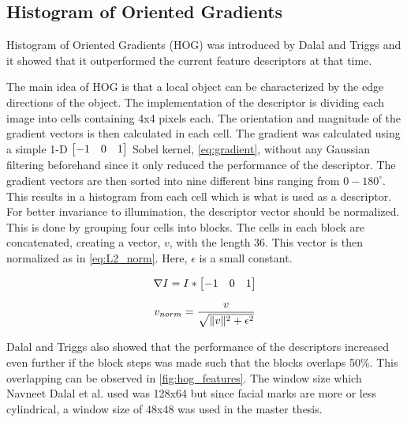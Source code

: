 \subsection{Histogram of Oriented Gradients} \label{subsection:HOG}

Histogram of Oriented Gradients (HOG) was introduced by Dalal and Triggs \cite{hog_dalal} and it showed that it outperformed the current feature descriptors at that time. 

The main idea of HOG is that a local object can be characterized by the edge directions of the object. The implementation of the descriptor is dividing each image into cells containing 4x4 pixels each. The orientation and magnitude of the gradient vectors is then calculated in each cell. The gradient was calculated using a simple 1-D 
$\left[ \begin{array}{@{}*{3}{c}@{}}
	-1 & 0 & 1  \\
\end{array} \right]$ Sobel kernel, \cref{eq:gradient}, without any Gaussian filtering beforehand since it only reduced the performance of the descriptor. The gradient vectors are then sorted into nine different bins ranging from $0-180^{\circ}$. This results in a histogram from each cell which is what is used as a descriptor. For better invariance to illumination, the descriptor vector should be normalized. This is done by grouping four cells into blocks. The cells in each block are concatenated, creating a vector, $v$, with the length 36. This vector is then normalized as in \cref{eq:L2_norm}. Here, $\epsilon$ is a small constant. 

\begin{equation} \label{eq:gradient}
\nabla I = I * \left[ \begin{array}{@{}*{3}{c}@{}}
-1 & 0 & 1  \\
\end{array} \right]
\end{equation}

\begin{equation} \label{eq:L2_norm}
v_{norm} = \frac{v}{\sqrt{\lVert v\rVert^2 + \epsilon^2}}
\end{equation}

Dalal and Triggs also showed that the performance of the descriptors increased even further if the block steps was made such that the blocks overlaps 50\%. This overlapping can be observed in \cref{fig:hog_features}. The window size which Navneet Dalal et al. used was 128x64 but since facial marks are more or less cylindrical, a window size of 48x48 was used in the master thesis. 

